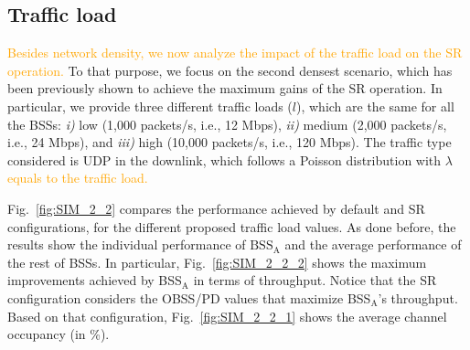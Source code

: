 \documentclass{ieeeaccess}
\begin{document}
\subsection{Traffic load}
\label{section:random_scenarios_traffic_load}
\textcolor{orange}{Besides network density, we now analyze the impact of the traffic load on the SR operation.} To that purpose, we focus on the second densest scenario, which has been previously shown to achieve the maximum gains of the SR operation. In particular, we provide three different traffic loads ($l$), which are the same for all the BSSs: \emph{i)} low (1,000 packets/s, i.e., 12 Mbps), \emph{ii)} medium (2,000 packets/s, i.e., 24 Mbps), and \emph{iii)} high (10,000 packets/s, i.e., 120 Mbps). The traffic type considered is UDP in the downlink, which follows a Poisson distribution with $\lambda$ \textcolor{orange}{equals to the traffic load.}

Fig.~\ref{fig:SIM_2_2} compares the performance achieved by default and SR configurations, for the different proposed traffic load values. As done before, the results show the individual performance of $\text{BSS}_\text{A}$ and the average performance of the rest of BSSs. In particular, Fig.~\ref{fig:SIM_2_2_2} shows the maximum improvements achieved by BSS$_\text{A}$ in terms of throughput. Notice that the SR configuration considers the OBSS/PD values that maximize BSS$_\text{A}$'s throughput. Based on that configuration, Fig.~\ref{fig:SIM_2_2_1} shows the average channel occupancy (in \%).
\end{document}
